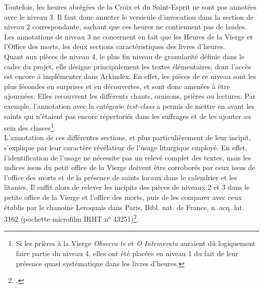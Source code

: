 \documentclass[a4paper,12pt,twoside]{book}
\begin{document}
Toutefois, les heures abrégées de la Croix et du Saint-Esprit ne sont pas annotées avec le niveau 3. Il faut donc annoter le versicule d’invocation dans la section de niveau 2 correspondante, sachant que ces heures ne contiennent pas de laudes. Les annotations de niveau 3 ne concernent en fait que les Heures de la Vierge et l’Office des morts, les deux sections caractéristiques des livres d'heures.\\

Quant aux pièces de niveau 4, le plus fin niveau de granularité définie dans le cadre du projet, elle désigne principalement les textes élémentaires, dont l'accès est encore à implémenter dans Arkindex. En effet, les pièces de ce niveau sont les plus fécondes en surprises et en découvertes, et sont donc amenées à être ajournées. Elles recouvrent les différents chants, oraisons, prières ou lectures. Par exemple, l'annotation avec la catégorie \og \textit{test-class}\fg{} a permis de mettre en avant les saints qui n'étaient pas encore répertoriés dans les suffrages et de les ajouter au sein des classes\footnote{Si les prières à la Vierge \textit{Obsecro te} et \textit{O Intemerata} auraient dû logiquement faire partie du niveau 4, elles ont été placées en niveau 1 du fait de leur présence quasi systématique dans les livres d'heures.}.\\

L'annotation de ces différentes sections, et plus particulièrement de leur incipit, s'explique par leur caractère révélateur de l'usage liturgique employé. En effet, l'identification de l'usage ne nécessite pas un relevé complet des textes, mais les indices issus du petit office de la Vierge doivent être corroborés par ceux issus de l'office des morts et de la présence de saints locaux dans le calendrier et les litanies. Il suffit alors de relever les incipits des pièces de niveaux 2 et 3 dans le petite office de la Vierge et l'office des morts, puis de les comparer avec ceux établis par le chanoine Leroquais dans Paris, Bibl. nat. de France, n. acq. lat. 3162 (pochette microfilm IRHT n° 43251)\footcite[p. 105-106]{initiation_man_lit}.\\ 
\end{document}
